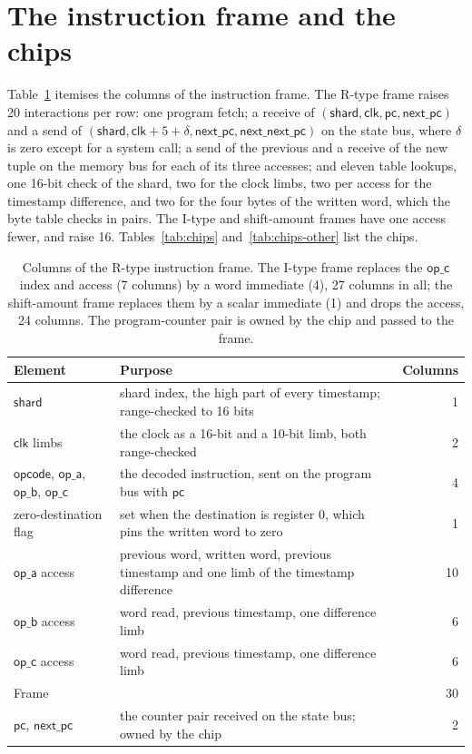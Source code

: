 \section{The instruction frame and the chips}
\label{sec:app-chips}
\label{sec:app-frame}

Table~\ref{tab:frame} itemises the columns of the instruction frame. The R-type frame raises 20 interactions per row: one program fetch; a receive of $(\mathsf{shard}, \mathsf{clk}, \mathsf{pc}, \mathsf{next\_pc})$ and a send of $(\mathsf{shard}, \mathsf{clk} + 5 + \delta, \mathsf{next\_pc}, \mathsf{next\_next\_pc})$ on the state bus, where $\delta$ is zero except for a system call; a send of the previous and a receive of the new tuple on the memory bus for each of its three accesses; and eleven table lookups, one 16-bit check of the shard, two for the clock limbs, two per access for the timestamp difference, and two for the four bytes of the written word, which the byte table checks in pairs. The I-type and shift-amount frames have one access fewer, and raise 16. Tables~\ref{tab:chips} and~\ref{tab:chips-other} list the chips.

\begin{table}[!htb]
\centering
\small
\caption{Columns of the R-type instruction frame. The I-type frame replaces the $\mathsf{op\_c}$ index and access (7 columns) by a word immediate (4), 27 columns in all; the shift-amount frame replaces them by a scalar immediate (1) and drops the access, 24 columns. The program-counter pair is owned by the chip and passed to the frame.}
\label{tab:frame}
\begin{tabular}{@{}lp{}r@{}}
\toprule
Element & Purpose & Columns \\
\midrule
$\mathsf{shard}$ & shard index, the high part of every timestamp; range-checked to 16 bits & 1 \\
$\mathsf{clk}$ limbs & the clock as a 16-bit and a 10-bit limb, both range-checked & 2 \\
$\mathsf{opcode}$, $\mathsf{op\_a}$, $\mathsf{op\_b}$, $\mathsf{op\_c}$ & the decoded instruction, sent on the program bus with $\mathsf{pc}$ & 4 \\
zero-destination flag & set when the destination is register 0, which pins the written word to zero & 1 \\
$\mathsf{op\_a}$ access & previous word, written word, previous timestamp and one limb of the timestamp difference & 10 \\
$\mathsf{op\_b}$ access & word read, previous timestamp, one difference limb & 6 \\
$\mathsf{op\_c}$ access & word read, previous timestamp, one difference limb & 6 \\
\midrule
Frame & & 30 \\
$\mathsf{pc}$, $\mathsf{next\_pc}$ & the counter pair received on the state bus; owned by the chip & 2 \\
\bottomrule
\end{tabular}
\end{table}

